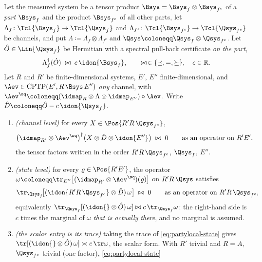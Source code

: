 \begin{lemma}\label{lem:party-local}
Let the measured system be a tensor product $\Bsys=\Bsys_f\otimes\Bsys_{f^c}$
of a \emph{part} $\Bsys_f$ and the product $\Bsys_{f^c}$ of all other parts,
let $\Lambda_f\colon\Tcl{\Bsys_f}\to\Tcl{\Qsys_f}$ and
$\Lambda_{f^c}\colon\Tcl{\Bsys_{f^c}}\to\Tcl{\Qsys_{f^c}}$ be channels, and
put $\Lambda\coloneqq\Lambda_f\otimes\Lambda_{f^c}$ and
$\Qsys\coloneqq\Qsys_f\otimes\Qsys_{f^c}$. Let $\hat O\in\Lin{\Qsys_f}$ be
Hermitian with a spectral pull-back certificate \emph{on the part},
\begin{equation}\label{eq:partcert}
  \Lambda_f^{\dagger}(\hat O)\;\bowtie\;c\,\idon{\Bsys_f},
  \qquad\bowtie\,\in\{\preceq,=,\succeq\},\quad c\in\mathbb{R} .
\end{equation}
Let $R$ and $R'$ be finite-dimensional systems, $E'$, $E''$
finite-dimensional, and $\Aev\in\mathrm{CPTP}(E',R\,\Bsys\,E'')$ \emph{any}
channel, with
$\Aev^{\sq}\coloneqq(\idmap_R\otimes\Lambda\otimes\idmap_{E''})\circ\Aev$.
Write $\hat D\coloneqq\hat O-c\,\idon{\Qsys_f}$.
\begin{enumerate}[label=(\roman*),leftmargin=2.2em]
\item \emph{(channel level)} for every $X\in\Pos{R'R\,\Qsys_{f^c}}$,
\begin{equation}\label{eq:partylocal-channel}
  \big(\idmap_{R'}\otimes\Aev^{\sq}\big)^{\dagger}
  \big(X\otimes\hat D\otimes\idon{E''}\big)\;\bowtie\;0
  \qquad\text{as an operator on }R'E' ,
\end{equation}
the tensor factors written in the order $R'R\,\Qsys_{f^c}$, $\Qsys_f$, $E''$.
\item \emph{(state level)} for every $\varrho\in\Pos{R'E'}$, the operator
$\omega\coloneqq\tr_{E''}\big[(\idmap_{R'}\otimes\Aev^{\sq})(\varrho)\big]$
on $R'R\,\Qsys$ satisfies
\begin{equation}\label{eq:partylocal-state}
  \tr_{\Qsys_f}\!\big[(\idon{R'R\,\Qsys_{f^c}}\otimes\hat D)\,\omega\big]
  \;\bowtie\;0
  \qquad\text{as an operator on }R'R\,\Qsys_{f^c},
\end{equation}
equivalently
$\tr_{\Qsys_f}[(\idon{}\otimes\hat O)\,\omega]\bowtie
c\,\tr_{\Qsys_f}\omega$: the right-hand side is $c$ times the marginal of
$\omega$ \emph{that is actually there}, and no marginal is assumed.
\item \emph{(the scalar entry is its trace)} taking the trace of
\eqref{eq:partylocal-state} gives
$\tr[(\idon{}\otimes\hat O)\,\omega]\bowtie c\,\tr\omega$, the scalar form.
With $R'$ trivial and $R=A$, $\Qsys_{f^c}$ trivial (one factor), \eqref{eq:partylocal-state}

\end{enumerate}
\end{lemma}
